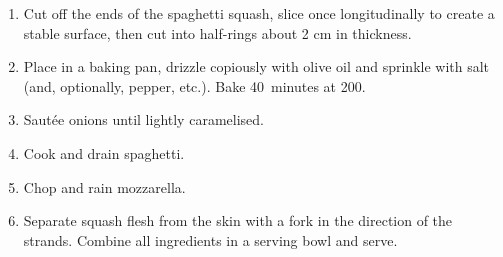 
\begin{ingredients}
\end{ingredients}


\begin{recipe}
  \begin{enumerate}

  \item Cut off the ends of the spaghetti squash, slice once
    longitudinally to create a stable surface, then cut into
    half-rings about 2 cm in thickness.

  \item Place in a baking pan, drizzle copiously with olive oil and
    sprinkle with salt (and, optionally, pepper, etc.).  Bake
    40~minutes at 200\degreeC.

  \item Sautée onions until lightly caramelised.

  \item Cook and drain spaghetti.

  \item Chop and rain mozzarella.

  \item Separate squash flesh from the skin with a fork in the
    direction of the strands.  Combine all ingredients in a serving
    bowl and serve.

  \end{enumerate}
\end{recipe}

